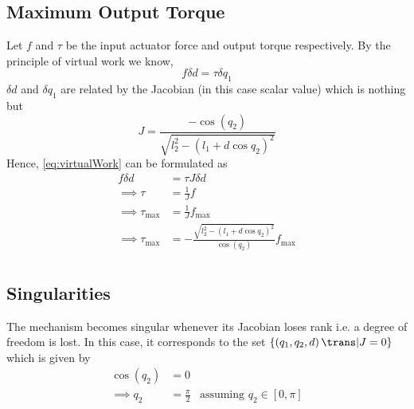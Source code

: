 \subsection{Maximum Output Torque}
Let $f$ and $\tau$ be the input actuator force and output torque respectively. By the principle of virtual work we know,
\begin{equation}
	f\delta d = \tau\delta q_1
	\label{eq:virtualWork}
\end{equation}
$\delta d$ and $\delta q_1$ are related by the Jacobian (in this case scalar value) which is nothing but
\begin{equation*}
	J = \frac{-\cos\left(q_2\right)}{\sqrt{l_2^2 - \left(l_1 + d\cos q_2\right)^2}}
\end{equation*}
Hence, \eqref{eq:virtualWork} can be formulated as
\begin{align*}
	f\delta d &= \tau J \delta d\\
	\implies \tau &= \frac{1}{J} f\\
	\implies \tau_{\text{max}} &= \frac{1}{J} f_{\text{max}}\\
	\implies \tau_{\text{max}} &= -\frac{\sqrt{l_2^2 - \left(l_1 + d\cos q_2\right)^2}}{\cos\left(q_2\right)} f_{\text{max}}\\
\end{align*}
\subsection{Singularities}
The mechanism becomes singular whenever its Jacobian loses rank i.e. a degree of freedom is lost. In this case, it corresponds to the set $\left\{\left(q_1, q_2, d\right)\trans | J = 0\right\}$ which is given by
\begin{align*}
	\cos\left(q_2\right) &= 0\\
	\implies q_2 &= \frac{\pi}{2} & \text{assuming } q_2 \in \left[0,\pi\right]
\end{align*}